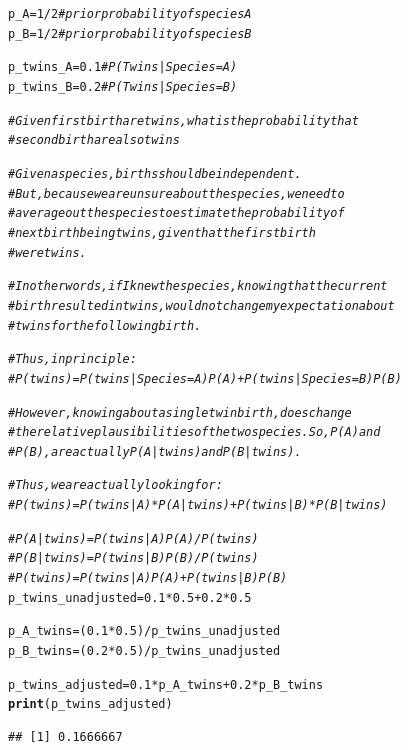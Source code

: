\documentclass[12pt]{article}\usepackage[]{graphicx}\usepackage[]{color}
\makeatletter
\newcommand{\hlnum}[1]{\textcolor[rgb]{0.686,0.059,0.569}{#1}}%
\newcommand{\hlcom}[1]{\textcolor[rgb]{0.678,0.584,0.686}{\textit{#1}}}%
\newcommand{\hlopt}[1]{\textcolor[rgb]{0,0,0}{#1}}%
\newcommand{\hlstd}[1]{\textcolor[rgb]{0.345,0.345,0.345}{#1}}%
\newcommand{\hlkwb}[1]{\textcolor[rgb]{0.69,0.353,0.396}{#1}}%
\newcommand{\hlkwd}[1]{\textcolor[rgb]{0.737,0.353,0.396}{\textbf{#1}}}%
\newenvironment{kframe}{%
 \def\at@end@of@kframe{}%
 \ifinner\ifhmode%
  \def\at@end@of@kframe{\end{minipage}}%
  \begin{minipage}{\columnwidth}%
 \fi\fi%
 \def\FrameCommand##1{\hskip\@totalleftmargin \hskip-\fboxsep
 \colorbox{shadecolor}{##1}\hskip-\fboxsep
     \hskip-\linewidth \hskip-\@totalleftmargin \hskip\columnwidth}%
 \MakeFramed {\advance\hsize-\width
   \@totalleftmargin\z@ \linewidth\hsize
   \@setminipage}}%
 {\par\unskip\endMakeFramed%
 \at@end@of@kframe}
\newenvironment{knitrout}{}{} %
\makeatother
\begin{document}
\begin{knitrout}
\color{fgcolor}\begin{kframe}
\begin{alltt}
\hlstd{p_A} \hlkwb{=} \hlnum{1}\hlopt{/}\hlnum{2} \hlcom{# prior probability of species A}
\hlstd{p_B} \hlkwb{=} \hlnum{1}\hlopt{/}\hlnum{2} \hlcom{# prior probability of species B}

\hlstd{p_twins_A} \hlkwb{=} \hlnum{0.1} \hlcom{# P(Twins|Species = A)}
\hlstd{p_twins_B} \hlkwb{=} \hlnum{0.2} \hlcom{# P(Twins|Species = B)}

\hlcom{# Given first birth are twins, what is the probability that}
\hlcom{# second birth are also twins}


\hlcom{# Given a species, births should be independent. }
\hlcom{# But, because we are unsure about the species, we need to }
\hlcom{# average out the species to estimate the probability of}
\hlcom{# next birth being twins, given that the first birth }
\hlcom{# were twins.}

\hlcom{# In other words,if I knew the species, knowing that the current }
\hlcom{# birth resulted in twins, would not change my expectation about }
\hlcom{# twins for the following birth.}

\hlcom{# Thus, in principle:}
\hlcom{# P(twins) = P(twins|Species = A)P(A) + P(twins|Species = B)P(B)}

\hlcom{# However, knowing about a single twin birth, does change }
\hlcom{# the relative plausibilities of the two species. So, P(A) and}
\hlcom{# P(B), are actually P(A|twins) and P(B|twins).}

\hlcom{# Thus, we are actually looking for:}
\hlcom{# P(twins) = P(twins|A)*P(A|twins) + P(twins|B)*P(B|twins)}

\hlcom{# P(A|twins) = P(twins|A)P(A)/P(twins)}
\hlcom{# P(B|twins) = P(twins|B)P(B)/P(twins)}
\hlcom{# P(twins) = P(twins|A)P(A) + P(twins|B)P(B)}
\hlstd{p_twins_unadjusted} \hlkwb{=} \hlnum{0.1} \hlopt{*} \hlnum{0.5} \hlopt{+} \hlnum{0.2} \hlopt{*} \hlnum{0.5}

\hlstd{p_A_twins} \hlkwb{=} \hlstd{(}\hlnum{0.1} \hlopt{*} \hlnum{0.5}\hlstd{)}\hlopt{/}\hlstd{p_twins_unadjusted}
\hlstd{p_B_twins} \hlkwb{=} \hlstd{(}\hlnum{0.2} \hlopt{*} \hlnum{0.5}\hlstd{)}\hlopt{/}\hlstd{p_twins_unadjusted}

\hlstd{p_twins_adjusted} \hlkwb{=} \hlnum{0.1} \hlopt{*} \hlstd{p_A_twins} \hlopt{+} \hlnum{0.2} \hlopt{*} \hlstd{p_B_twins}
\hlkwd{print}\hlstd{(p_twins_adjusted)}
\end{alltt}
\begin{verbatim}
## [1] 0.1666667
\end{verbatim}
\end{kframe}
\end{knitrout}
\end{document}
